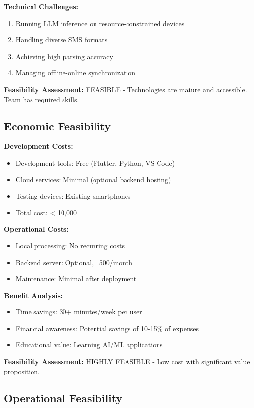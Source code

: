 \documentclass[11pt,a4paper]{report}
\begin{document}
\textbf{Technical Challenges:}
\begin{enumerate}
    \item Running LLM inference on resource-constrained devices
    \item Handling diverse SMS formats
    \item Achieving high parsing accuracy
    \item Managing offline-online synchronization
\end{enumerate}

\textbf{Feasibility Assessment:} FEASIBLE - Technologies are mature and accessible. Team has required skills.

\subsection{Economic Feasibility}

\textbf{Development Costs:}
\begin{itemize}
    \item Development tools: Free (Flutter, Python, VS Code)
    \item Cloud services: Minimal (optional backend hosting)
    \item Testing devices: Existing smartphones
    \item Total cost: < 10,000
\end{itemize}

\textbf{Operational Costs:}
\begin{itemize}
    \item Local processing: No recurring costs
    \item Backend server: Optional, ~500/month
    \item Maintenance: Minimal after deployment
\end{itemize}

\textbf{Benefit Analysis:}
\begin{itemize}
    \item Time savings: 30+ minutes/week per user
    \item Financial awareness: Potential savings of 10-15\% of expenses
    \item Educational value: Learning AI/ML applications
\end{itemize}

\textbf{Feasibility Assessment:} HIGHLY FEASIBLE - Low cost with significant value proposition.

\subsection{Operational Feasibility}
\end{document}
